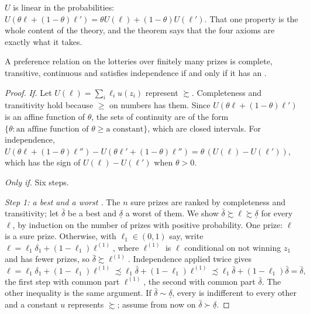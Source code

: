 $U$ is linear in the probabilities: $U(\theta\ell + (1-\theta)\ell') = \theta U(\ell) + (1-\theta)
U(\ell')$. That one property is the whole content of the theory, and the theorem says that the four
axioms are exactly what it takes.

\begin{theorem}\label{thm:b2:expected-utility:vnm}
A preference relation on the lotteries over finitely many prizes is complete, transitive, continuous
and satisfies independence if and only if it has an .
\end{theorem}

\begin{proof}
\emph{If.} Let $U(\ell) = \sum_i \ell_i u(z_i)$ represent $\succsim$. Completeness and transitivity
hold because $\ge$ on numbers has them. Since $U(\theta\ell + (1-\theta)\ell')$ is an affine function
of $\theta$, the sets of continuity are of the form $\{\theta : \text{an affine function of }\theta
\ge \text{a constant}\}$, which are closed intervals. For independence,
$U(\theta\ell + (1-\theta)\ell'') - U(\theta\ell' + (1-\theta)\ell'') = \theta\,(U(\ell) - U(\ell'))$,
which has the sign of $U(\ell) - U(\ell')$ when $\theta > 0$.

\emph{Only if.} Six steps.

\emph{Step 1: a best and a worst .} The $n$ sure prizes are ranked by completeness and
transitivity; let $\bar\delta$ be a best and $\underline\delta$ a worst of them. We show $\bar\delta
\succsim \ell \succsim \underline\delta$ for every $\ell$, by induction on the number of prizes with
positive probability. One prize: $\ell$ is a sure prize. Otherwise, with $\ell_1 \in (0,1)$ say, write
$\ell = \ell_1 \delta_1 + (1-\ell_1)\ell^{(1)}$, where $\ell^{(1)}$ is $\ell$ conditional on not
winning $z_1$ and has fewer prizes, so $\bar\delta \succsim \ell^{(1)}$. Independence applied twice
gives
\[
\ell = \ell_1\delta_1 + (1-\ell_1)\ell^{(1)} \precsim \ell_1\bar\delta + (1-\ell_1)\ell^{(1)} \precsim
\ell_1\bar\delta + (1-\ell_1)\bar\delta = \bar\delta ,
\]
the first step with common part $\ell^{(1)}$, the second with common part $\bar\delta$. The other
inequality is the same argument. If $\bar\delta \sim \underline\delta$, every  is indifferent
to every other and a constant $u$ represents $\succsim$; assume from now on $\bar\delta \succ
\underline\delta$.


\end{proof}
